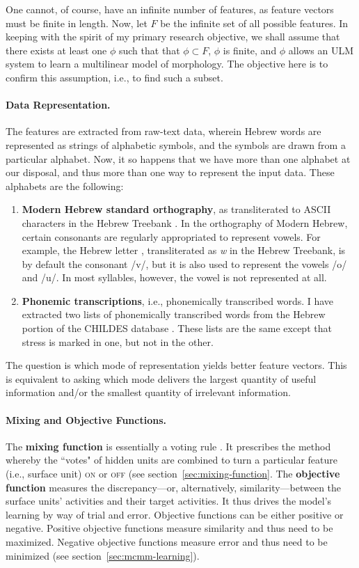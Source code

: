 One cannot, of course, have an infinite number of features, as feature vectors must be finite in length.
Now, let $F$ be the infinite set of all possible features. In keeping with the spirit of my primary research objective, we shall assume that there exists at least one $\phi$ such that that $\phi \subset F$, $\phi$ is finite, and $\phi$ allows an ULM system to learn a multilinear model of morphology. The objective here is to confirm this assumption, i.e., to find such a subset.

\paragraph{Data Representation.} The features are extracted from raw-text data, wherein Hebrew words are represented as strings of alphabetic symbols, and the symbols are drawn from a particular alphabet. Now, it so happens that we have more than one alphabet at our disposal, and thus more than one way to represent the input data. These alphabets are the following:
	\begin{enumerate}
		\item \textbf{Modern Hebrew standard orthography}, as transliterated to ASCII characters in the Hebrew Treebank \citep{simaan-et-al:2001}. In the orthography of Modern Hebrew, certain consonants are regularly appropriated to represent vowels. For example, the Hebrew letter
		, transliterated as \textit{w} in the Hebrew Treebank, is by default the consonant /v/, but it is also used to represent the vowels /o/ and /u/. In most syllables, however, the vowel is not represented at all. 
		\item \textbf{Phonemic transcriptions}, i.e., phonemically transcribed words. I have extracted two lists of phonemically transcribed words from the Hebrew portion of the CHILDES database \citep{macwhinney:2000a}. 
		 These lists are the same except that stress is marked in one, but not in the other.
	\end{enumerate}
	The question is which mode of representation yields better feature vectors. This is equivalent to asking which mode delivers the largest quantity of useful information and/or the smallest quantity of irrelevant information.
	\paragraph{Mixing and Objective Functions.} The \textbf{mixing function} 
is essentially a voting rule \citep{saund:94}. It prescribes the method whereby the 
``votes" of  hidden units are combined to turn a particular feature (i.e., surface unit) \textsc{on} or \textsc{off} (see section~\ref{sec:mixing-function}. The \textbf{objective function} measures the discrepancy---or, alternatively, similarity---between the surface units' activities and their target activities. 
It thus drives the model's learning by way of trial and error. Objective functions can 
be either positive or negative. Positive objective functions measure similarity and thus 
need to be maximized. Negative objective functions measure error and thus need to be minimized (see section~\ref{sec:mcmm-learning}).


